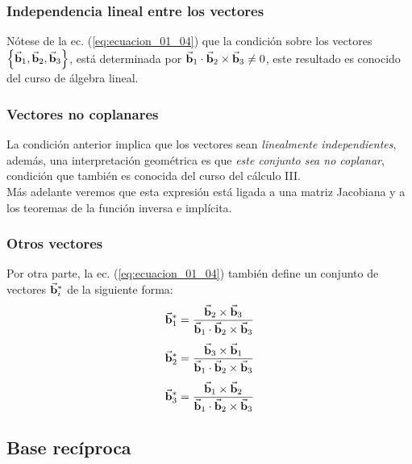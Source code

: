 \documentclass[12pt]{beamer}
\begin{document}
\begin{frame}
\frametitle{Independencia lineal entre los vectores}
Nótese de la ec. (\ref{eq:ecuacion_01_04}) que la condición sobre los vectores $\left\{ \va{b}_{1}, \va{b}_{2}, \va{b}_{3}  \right\}$, está determinada por $\va{b}_{1} \cdot \va{b}_{2} \times \va{b}_{3} \neq 0$, \pause este resultado es conocido del curso de álgebra lineal.
\end{frame}
\begin{frame}
\frametitle{Vectores no coplanares}
La condición anterior implica que los vectores sean \emph{linealmente independientes}, además, una interpretación geométrica es que \emph{este conjunto sea no coplanar}, condición que también es conocida del curso del cálculo III.
\\
\bigskip
\pause
Más adelante veremos que esta expresión está ligada a una matriz Jacobiana y a los teoremas de la función inversa e implícita.
\end{frame}
\begin{frame}
\frametitle{Otros vectores}
Por otra parte, la ec. (\ref{eq:ecuacion_01_04}) también define un conjunto de vectores $\va{b}_{i}^{*}$ de la siguiente forma:
\pause
\begin{align}
\begin{aligned}
\va{b}_{1}^{*} &= \dfrac{\va{b}_{2} \times \va{b}_{3}}{\va{b}_{1} \cdot \va{b}_{2} \times \va{b}_{3}} \\[0.35em]
\va{b}_{2}^{*} &= \dfrac{\va{b}_{3} \times \va{b}_{1}}{\va{b}_{1} \cdot \va{b}_{2} \times \va{b}_{3}} \\[0.35em]
\va{b}_{3}^{*} &= \dfrac{\va{b}_{1} \times \va{b}_{2}}{\va{b}_{1} \cdot \va{b}_{2} \times \va{b}_{3}}
\end{aligned}
\label{eq:ecuacion_01_05}
\end{align}
\end{frame}

\subsection{Base recíproca}
\end{document}
